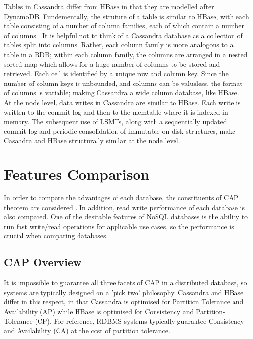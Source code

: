 \documentclass[10pt]{article}
\begin{document}
Tables in Cassandra differ from HBase in that they are modelled after DynamoDB. Fundementally, the struture of a table is similar to HBase, with each table consisting of a number of column families, each of which contain a number of columns \citep{7507964}. It is helpful not to think of a Cassandra database as a collection of tables split into columns. Rather, each column family is more analogous to a table in a RDB; within each column family, the columns are arranged in a nested sorted map which allows for a huge number of columns to be stored and retrieved. Each cell is identified by a unique row and column key. Since the number of column keys is unbounded, and columns can be valueless, the format of columns is variable; making Cassandra a wide column database, like HBase. \citep{harrison}\\

At the node level, data writes in Cassandra are similar to HBase. Each write is written to the commit log and then to the memtable where it is indexed in memory. The subsequent use of LSMTs, along with a sequentially updated commit log and periodic consolidation of immutable on-disk structures, make Casandra and HBase structurally similar at the node level.

\section{Features Comparison}
In order to compare the advantages of each database, the constituents of CAP theorem are considered \citep{harrison}.
In addition, read write performance of each database is also compared. One of the desirable features of NoSQL databases is the ability to run fast write/read operations for applicable use cases, so the performance is crucial when comparing databases.

\subsection{CAP Overview}
It is impossible to guarantee all three facets of CAP in a distributed database, so systems are typically designed on a 'pick two' philosophy. Cassandra and HBase differ in this respect, in that Cassandra is optimised for Partition Tolerance and Availability (AP) while HBase is optimised for Consistency and Partition-Tolerance (CP). For reference, RDBMS systems typically guarantee Consistency and Availability (CA) at the cost of partition tolerance\citep{harrison}.
\end{document}
